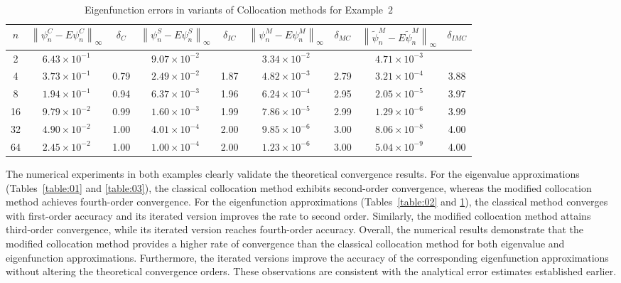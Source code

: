 \documentclass[]{interact}
\renewcommand{\arraystretch}{1.32}
\theoremstyle{plain}%
\theoremstyle{definition}
\theoremstyle{remark}
\newcommand{\norm}[1]{\left\lVert #1\right\rVert}
\begin{document}
\begin{table}[h!]
	\small
	\centering
	\setlength{\tabcolsep}{2.3pt}
	\renewcommand{\arraystretch}{1.2}
	\caption{Eigenfunction errors in variants of Collocation methods for Example~$2$}
	\label{table:04}
	\begin{tabular}{|c|cc|cc|cc|cc|}
		\hline
		$n$ & $\norm{\psi_n^C - E \psi_n^C }_\infty$ & $\delta_C$ 
		& $\norm{\psi_n^S - E \psi_n^S }_\infty$ & $\delta_{IC}$ 
		& $\norm{\psi_n^M - E \psi_n^M }_\infty$ & $\delta_{MC}$ 
		& $\norm{\widetilde{\psi}_n^M - E \widetilde{\psi}_n^M }_\infty$ & $\delta_{IMC}$ \\[3.5pt]
		\hline
		2   & $6.43\times10^{-1}$ &      & $9.07\times10^{-2}$ &      & $3.34\times10^{-2}$ &      & $4.71\times10^{-3}$ &      \\
		4   & $3.73\times10^{-1}$ & 0.79 & $2.49\times10^{-2}$ & 1.87 & $4.82\times10^{-3}$ & 2.79 & $3.21\times10^{-4}$ & 3.88   \\[3pt]
		8   & $1.94\times10^{-1}$ & 0.94 & $6.37\times10^{-3}$ & 1.96 & $6.24\times10^{-4}$ & 2.95 & $2.05\times10^{-5}$ & 3.97   \\[3pt]
		16  & $9.79\times10^{-2}$ & 0.99 & $1.60\times10^{-3}$ & 1.99 & $7.86\times10^{-5}$ & 2.99 & $1.29\times10^{-6}$ & 3.99   \\[3pt]
		32  & $4.90\times10^{-2}$ & 1.00 & $4.01\times10^{-4}$ & 2.00 & $9.85\times10^{-6}$ & 3.00 & $8.06\times10^{-8}$ & 4.00   \\[3pt]
		64  & $2.45\times10^{-2}$ & 1.00 & $1.00\times10^{-4}$ & 2.00 & $1.23\times10^{-6}$ & 3.00 & $5.04\times10^{-9}$ & 4.00   \\[3pt]
		\hline
	\end{tabular}
\end{table}



The numerical experiments in both examples clearly validate the theoretical convergence results. For the eigenvalue approximations (Tables~\ref{table:01} and \ref{table:03}), 
the classical collocation method exhibits second-order convergence, 
whereas the modified collocation method achieves fourth-order convergence. 
For the eigenfunction approximations (Tables~\ref{table:02} and \ref{table:04}), 
the classical method converges with first-order accuracy and its iterated version improves the rate to second order. Similarly, the modified collocation method attains third-order convergence, while its iterated version reaches fourth-order accuracy. Overall, the numerical results demonstrate that the modified collocation method provides a higher rate of convergence than the classical collocation method for both eigenvalue and eigenfunction approximations. Furthermore, the iterated versions improve the accuracy of the corresponding eigenfunction approximations without altering the theoretical convergence orders. These observations are consistent with the analytical error estimates established earlier.
\end{document}

